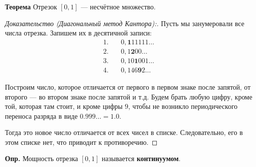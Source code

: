 \documentclass[10pt, a4paper]{article}
\begin{document}
\noindent \textbf{Теорема}
Отрезок $[0, 1]$ --- несчётное множество.

\vspace{0.3cm}

\begin{proof}[Доказательство (Диагональный метод Кантора):]
Пусть мы занумеровали все числа отрезка. Запишем их в десятичной записи:
\begin{align*}
    1. & \quad 0, \textbf{1}11111\dots \\
    2. & \quad 0,1\textbf{2}00\dots \\
    3. & \quad 0,10\textbf{1}001\dots \\
    4. & \quad 0,146\textbf{9}2\dots
\end{align*}

\noindent Построим число, которое отличается от первого в первом знаке после запятой, от второго --- во втором знаке после запятой и т.д. Будем брать любую цифру, кроме той, которая там стоит, и кроме цифры $9$, чтобы не возникло периодического переноса разряда в виде $0.999\dots = 1.0$.

\vspace{0.2cm}
\noindent Тогда это новое число отличается от всех чисел в списке. Следовательно, его в этом списке нет, что приводит к противоречию.
\end{proof}

\vspace{0.2cm}
\noindent \textbf{Опр.}
Мощность отрезка $[0, 1]$ называется \textbf{континуумом}.
\end{document}
